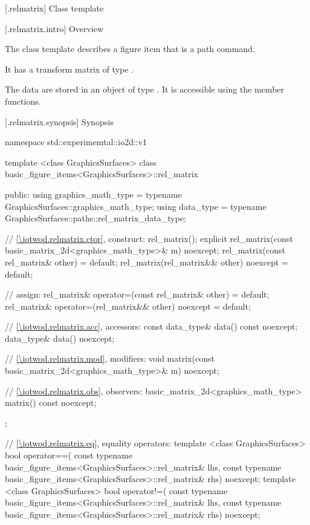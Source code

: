  [\iotwod.relmatrix] {Class template }

 [\iotwod.relmatrix.intro] {Overview}

\pnum
{}%
The class template  describes a figure item that is a path command.

\pnum
It has a transform matrix of type .

\pnum
The data are stored in an object of type . It is accessible using the  member functions.

 [\iotwod.relmatrix.synopsis] {Synopsis}
\begin{codeblock}
namespace std::experimemtal::io2d::v1 {
  template <class GraphicsSurfaces>
  class basic_figure_items<GraphicsSurfaces>::rel_matrix {
  public:
    using graphics_math_type = typename GraphicsSurfaces::graphics_math_type;
    using data_type =
      typename GraphicsSurfaces::paths::rel_matrix_data_type;

    // \ref{\iotwod.relmatrix.ctor}, construct:
    rel_matrix();
    explicit rel_matrix(const basic_matrix_2d<graphics_math_type>& m) noexcept;
    rel_matrix(const rel_matrix& other) = default;
    rel_matrix(rel_matrix&& other) noexcept = default;

    // assign:
    rel_matrix& operator=(const rel_matrix& other) = default;
    rel_matrix& operator=(rel_matrix&& other) noexcept = default;

    // \ref{\iotwod.relmatrix.acc}, accessors:
    const data_type& data() const noexcept;
    data_type& data() noexcept;

    // \ref{\iotwod.relmatrix.mod}, modifiers:
    void matrix(const basic_matrix_2d<graphics_math_type>& m) noexcept;

    // \ref{\iotwod.relmatrix.obs}, observers:
    basic_matrix_2d<graphics_math_type> matrix() const noexcept;
  };
  
  // \ref{\iotwod.relmatrix.eq}, equality operators:
  template <class GraphicsSurfaces>
  bool operator==(
    const typename basic_figure_items<GraphicsSurfaces>::rel_matrix& lhs,
    const typename basic_figure_items<GraphicsSurfaces>::rel_matrix& rhs) 
    noexcept;  
  template <class GraphicsSurfaces>
  bool operator!=(
    const typename basic_figure_items<GraphicsSurfaces>::rel_matrix& lhs,
    const typename basic_figure_items<GraphicsSurfaces>::rel_matrix& rhs) 
    noexcept;  
}
\end{codeblock}

